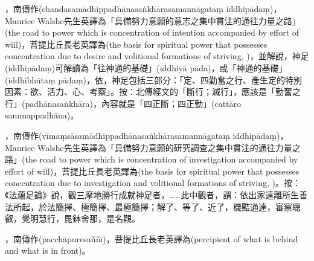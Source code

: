 \startitemgroup[noteitems]
\item{}，南傳作(chandasamādhippadhānasaṅkhārasamannāgataṃ iddhipādaṃ)，Maurice Walshe先生英譯為「具備努力意願的意志之集中貫注的通往力量之路」(the road to power which is concentration of intention accompanied by effort of will)，菩提比丘長老英譯為(the basis for spiritual power that possesses concentration due to desire and volitional formations of striving, )，並解說，神足(iddhipādaṃ)可解讀為「往神通的基礎」(iddhiyā pāda)，或「神通的基礎」(iddhibhūtaṃ pādaṃ)，依，神足包括三部分：「定、四勤奮之行、產生定的特別因素：欲、活力、心、考察」。按：北傳經文的「斷行；滅行」，應該是「勤奮之行」(padhānasaṅkhāra)，內容就是「四正斷；四正勤」(cattāro sammappadhāna)。
\stopitemgroup

\startitemgroup[noteitems]
\item{}，南傳作(vīmaṃsāsamādhippadhānasaṅkhārasamannāgataṃ iddhipādaṃ)，Maurice Walshe先生英譯為「具備努力意願的研究調查之集中貫注的通往力量之路」(the road to power which is concentration of investigation accompanied by effort of will)，菩提比丘長老英譯為(the basis for spiritual power that possesses concentration due to investigation and volitional formations of striving, )。按：《法蘊足論》說，觀三摩地勝行成就神足者，……此中觀者，謂：依出家遠離所生善法所起，於法簡擇、極簡擇、最極簡擇；解了、等了、近了，機黠通達，審察聰叡，覺明慧行，毘鉢舍那，是名觀。
\stopitemgroup

\startitemgroup[noteitems]
\item{}，南傳作(pacchāpuresaññī)，菩提比丘長老英譯為(percipient of what is behind and what is in front)。
\stopitemgroup

